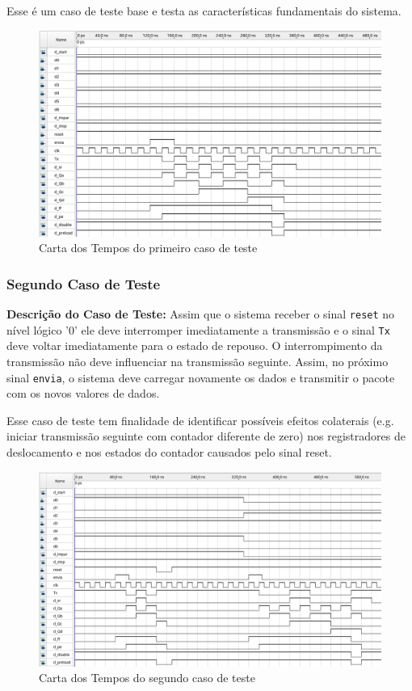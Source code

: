\documentclass[a4,12pt]{horizon-theme}
\begin{document}
Esse é um caso de teste base e testa as características fundamentais do sistema.

\begin{figure}[!ht]
    \centering
    \includegraphics[width=\textwidth]{tc-1.png}
    \caption{Carta dos Tempos do primeiro caso de teste}
    \label{fig:tc1}
\end{figure}

\newpage
\subsubsection{Segundo Caso de Teste}
\label{ap:tc-2}
{\bf Descrição do Caso de Teste:} Assim que o sistema receber o sinal \texttt{reset} no nível lógico '0' ele deve interromper imediatamente a transmissão e o sinal \texttt{Tx} deve voltar imediatamente para o estado de repouso. O interrompimento da transmissão não deve influenciar na transmissão seguinte. Assim, no próximo sinal \texttt{envia}, o sistema deve carregar novamente os dados e transmitir o pacote com os novos valores de dados.

Esse caso de teste tem finalidade de identificar possíveis efeitos colaterais (e.g. iniciar transmissão seguinte com contador diferente de zero) nos registradores de deslocamento e nos estados do contador causados pelo sinal reset.
\begin{figure}[!ht]
    \centering
    \includegraphics[width=\textwidth]{tc-2.png}
    \caption{Carta dos Tempos do segundo caso de teste}
    \label{fig:tc2}
\end{figure}
\end{document}

